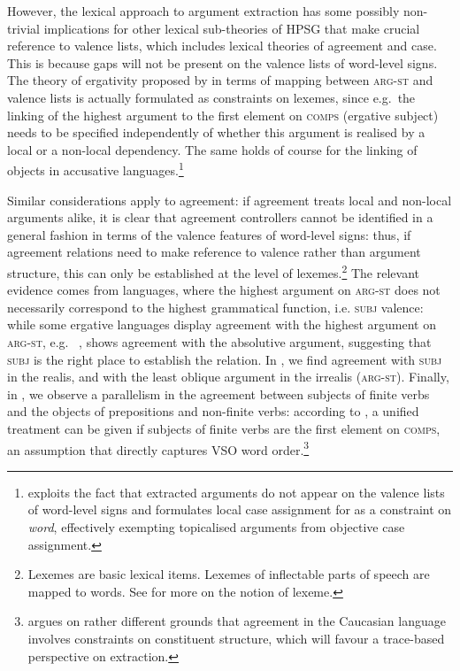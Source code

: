 \documentclass[output=paper
,notxmath 
 	        ,biblatex
                ,babelshorthands
                ,newtxmath
                ,draftmode
                ,colorlinks, citecolor=brown
]{langscibook}
\begin{document}
However, the lexical approach to argument extraction has some possibly
non-trivial implications for other lexical sub-theories of HPSG that
make crucial reference to valence lists, which includes lexical
theories of agreement and case. This is because gaps will not be
present on the valence lists of word-level signs. The theory of
ergativity proposed by \citet[Section~5.2]{Manning:Sag:99} in terms of
mapping between \textsc{arg-st} and valence lists is actually
formulated as constraints on lexemes, since e.g.\ the linking of the
highest argument to the first element on \textsc{comps} (ergative
subject) needs to be specified independently of whether this argument
is realised by a local or a non-local dependency. The same holds of
course for the linking of objects in accusative
languages.\footnote{\citet{Crysmann:09} exploits the fact that
  extracted arguments do not appear on the valence lists of word-level
  signs and formulates local case assignment for  as a
  constraint on \textit{word}, effectively exempting topicalised
  arguments from objective case assignment.}

Similar considerations apply to agreement: if agreement treats local
and non-local arguments alike, it is clear that agreement controllers
cannot be identified in a general fashion in terms of the valence
features of word-level signs: thus, if agreement relations need to make
reference to valence rather than argument structure, this can only be
established at the level of lexemes.\footnote{
{Lexemes are basic lexical items. Lexemes of inflectable parts of speech are mapped to
  words. See  for
  more on the notion of lexeme.}
} The relevant evidence comes from
languages, where the highest argument on \textsc{arg-st} does not
necessarily correspond to the highest grammatical function, i.e.
\textsc{subj} valence: while some ergative languages display agreement
with the highest argument on \textsc{arg-st}, e.g.\ 
\citep{harris_a84udi},  \citep{kibrik94:_archi} shows agreement
with the absolutive argument, suggesting that \textsc{subj} is the
right place to establish the relation. %
In  \citep{Crysmann:09}, we find agreement with \textsc{subj} in the realis, and with
the least oblique argument in the irrealis (\textsc{arg-st}). Finally,
in , we observe a parallelism in the agreement between subjects
of finite verbs and the objects of prepositions and non-finite verbs:
according to \citet[Section~4]{Borsley89}, a unified treatment can be given if
subjects of finite verbs are the first element on \textsc{comps}, an
assumption that directly captures  VSO word order.\footnote{
  \citet[Section~5.4]{Borsley:16:Archi} argues on rather different grounds that
  agreement in the Caucasian language  involves constraints on
  constituent structure, which will favour a trace-based perspective on
  extraction. }
\end{document}
